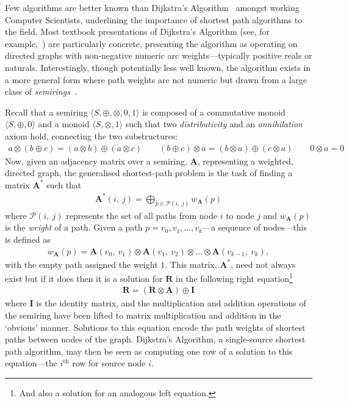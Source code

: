 Few algorithms are better known than Dijkstra's Algorithm~\cite{dijkstra:note:1959} amongst working Computer Scientists, underlining the importance of shortest path algorithms to the field.
Most textbook presentations of Dijkstra's Algorithm (see, for example,~\cite[Chapter 24]{clrs}) are particularly concrete, presenting the algorithm as operating on directed graphs with non-negative numeric arc weights---typically positive reals or naturals.
Interestingly, though potentially less well known, the algorithm exists in a more general form where path weights are not numeric but drawn from a large class of \emph{semirings}~\cite{mohri:semiring:2002}.

Recall that a semiring $\langle S, \oplus, \otimes, 0, 1 \rangle$ is composed of a commutative monoid $\langle S, \oplus, 0\rangle$ and a monoid $\langle S, \otimes, 1\rangle$ such that two \emph{distributivity} and an \emph{annihilation} axiom hold, connecting the two substructures:
\begin{gather*}
a\otimes (b \oplus c) = (a\otimes b) \oplus (a\otimes c) \qquad
(b \oplus c) \otimes a = (b\otimes a) \oplus (c\otimes a) \qquad
0 \otimes a = 0
\end{gather*}
Now, given an adjacency matrix over a semiring, $\mathbf{A}$, representing a weighted, directed graph, the generalised shortest-path problem is the task of finding a matrix $\mathbf{A}^*$ such that
\begin{gather*}
\label{eq:global}
\mathbf{A}^*(i,\ j) = \displaystyle\bigoplus_{p \in \mathcal{P}(i,\ j)} w_{\mathbf{A}}(p)
\end{gather*}
where $\mathcal{P}(i,\ j)$ represents the set of all paths from node $i$ to node $j$ and $w_{\mathbf{A}}(p)$ is the \emph{weight} of a path.
Given a path $p = v_0, v_1, \ldots, v_k$---a sequence of nodes---this is defined as
\begin{gather*}
    w_{\mathbf{A}}(p)
    =
    \mathbf{A}(v_0,\ v_1)
    \otimes \mathbf{A}(v_1,\ v_2)
    \otimes \ldots
    \otimes \mathbf{A}(v_{k-1},\ v_k),
\end{gather*}
with the empty path assigned the weight $1$.
This matrix, $\mathbf{A}^*$, need not always exist but if it does then it is a solution for $\mathbf{R}$ in the following right equation\footnote{And also a solution for an analogous left equation.}
\begin{gather*}
\mathbf{R} = (\mathbf{R} \otimes \mathbf{A}) \oplus \mathbf{I}
\end{gather*}
where $\mathbf{I}$ is the identity matrix, and the multiplication and addition operations of the semiring have been lifted to matrix multiplication and addition in the `obvious' manner.
Solutions to this equation encode the path weights of shortest paths between nodes of the graph.
Dijkstra's Algorithm, a single-source shortest path algorithm, may then be seen as computing one row of a solution to this equation---the $i^\mathrm{th}$ row for source node $i$.

